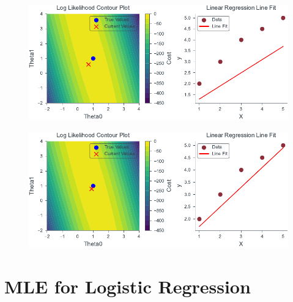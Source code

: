 \documentclass[handout]{beamer}
\begin{document}
\begin{frame}
    \begin{figure}
                \centerline{\includegraphics[scale=0.8]{../figures/mle/lin_reg_slider_2.pdf}}
\end{figure}
\end{frame}
\begin{frame}
    \begin{figure}
                \centerline{\includegraphics[scale=0.8]{../figures/mle/lin_reg_slider_3.pdf}}
\end{figure}
\end{frame}
\section{MLE for Logistic Regression}
\end{document}
